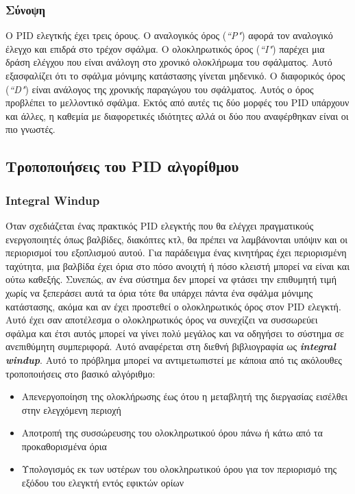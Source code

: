 \subsubsection{Σύνοψη}
Ο PID ελεγτκής έχει τρεις όρους. Ο αναλογικός όρος (\emph{``P"}) αφορά τον αναλογικό έλεγχο και επιδρά στο τρέχον σφάλμα. Ο ολοκληρωτικός όρος (\emph{``I"}) παρέχει μια δράση ελέγχου που είναι ανάλογη στο χρονικό ολοκλήρωμα του σφάλματος. Αυτό εξασφαλίζει ότι το σφάλμα μόνιμης κατάστασης γίνεται μηδενικό. Ο διαφορικός όρος (\emph{``D"}) είναι ανάλογος της χρονικής παραγώγου του σφάλματος. Αυτός ο όρος προβλέπει το μελλοντικό σφάλμα. Εκτός από αυτές τις δύο μορφές του PID υπάρχουν και άλλες, η καθεμία με διαφορετικές ιδιότητες αλλά οι δύο που αναφέρθηκαν είναι οι πιο γνωστές.

\subsection{Τροποποιήσεις του PID αλγορίθμου}

\subsubsection{Integral Windup}
Όταν σχεδιάζεται ένας πρακτικός PID ελεγκτής που θα ελέγχει πραγματικούς ενεργοποιητές όπως βαλβίδες, διακόπτες κτλ, θα πρέπει να λαμβάνονται υπόψιν και οι περιορισμοί του εξοπλισμού αυτού. Για παράδειγμα ένας κινητήρας έχει περιορισμένη ταχύτητα, μια βαλβίδα έχει όρια στο πόσο ανοιχτή ή πόσο κλειστή μπορεί να είναι και ούτω καθεξής. Συνεπώς, αν ένα σύστημα δεν μπορεί να φτάσει την επιθυμητή τιμή χωρίς να ξεπεράσει αυτά τα όρια τότε θα υπάρχει πάντα ένα σφάλμα μόνιμης κατάστασης, ακόμα και αν έχει προστεθεί ο ολοκληρωτικός όρος στον PID ελεγκτή. Αυτό έχει σαν αποτέλεσμα ο ολοκληρωτικός όρος να συνεχίζει να συσσωρεύει σφάλμα και έτσι αυτός μπορεί να γίνει πολύ μεγάλος και να οδηγήσει το σύστημα σε ανεπιθύμητη συμπεριφορά. Αυτό αναφέρεται στη διεθνή βιβλιογραφία ως \textbf{\emph{integral windup}}. Αυτό το πρόβλημα μπορεί να αντιμετωπιστεί με κάποια από τις ακόλουθες τροποποιήσεις στο βασικό αλγόριθμο:
\begin{itemize}
\item Απενεργοποίηση της ολοκλήρωσης έως ότου η μεταβλητή της διεργασίας εισέλθει στην ελεγχόμενη περιοχή
\item Αποτροπή της συσσώρευσης του ολοκληρωτικού όρου πάνω ή κάτω από τα προκαθορισμένα όρια
\item Υπολογισμός εκ των υστέρων του ολοκληρωτικού όρου για τον περιορισμό της εξόδου του ελεγκτή εντός εφικτών ορίων
\end{itemize}

